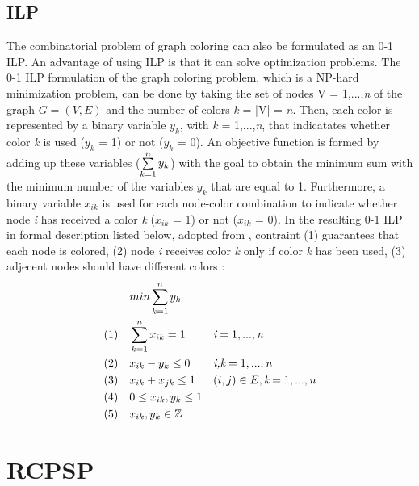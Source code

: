 \documentclass{sig-alternate}
\begin{document}
\subsection{ILP}
The combinatorial problem of graph coloring can also be formulated as an 0-1 ILP. An advantage of using ILP is that it can solve optimization problems. The 0-1 ILP formulation of the graph coloring problem, which is a NP-hard minimization problem, can be done by taking the set of nodes V = {1,...,\emph{n}} of the graph $G = (V,E)$ and the number of colors \emph{k} = |V| = \emph{n}. Then, each color is represented by a binary variable \emph{$y_k$}, with \emph{k} = 1,...,\emph{n}, that indicatates whether color \emph{k} is used (\emph{$y_k$} = 1) or not (\emph{$y_k$} = 0). An objective function is formed by adding up these variables ($\sum\limits_{k=1}^n \emph{$y_k$}$) with the goal to obtain the minimum sum with the minimum number of the variables \emph{$y_k$} that are equal to 1. Furthermore, a binary variable \emph{$x_{ik}$} is used for each node-color combination to indicate whether node \emph{i} has received a color \emph{k} (\emph{$x_{ik}$} = 1) or not (\emph{$x_{ik}$} = 0). In the resulting 0-1 ILP in formal description listed below, adopted from \cite{faigle2002mathprogramming}, contraint (1) guarantees that each node is colored, (2) node \emph{i} receives color \emph{k} only if color \emph{k} has been used, (3) adjecent nodes should have different colors :
\begin{subequations}
\begin{align*}
        & & & min \sum\limits_{k=1}^n \emph{$y_k$} & & \\
        &  (1) & & \sum\limits_{k=1}^n \emph{$x_{ik}$} = 1 & & \emph{i} = 1,...,\emph{n} \\
        &  (2) & & \emph{$x_{ik}$} - \emph{$y_k$} \leq 0 & & \emph{i,k} = 1,...,\emph{n} \\
        &  (3) & &  \emph{$x_{ik}$} + \emph{$x_{jk}$} \leq 1 & & (i,j) \in E, \emph{k} = 1,...,\emph{n} \\
        &  (4) & & 0 \leq \emph{$x_{ik}$}, \emph{$y_k$} \leq 1 & & \\
        &  (5) & & \emph{$x_{ik}$}, \emph{$y_k$} \in \mathbb{Z} & &
\end{align*}
\end{subequations}

\section{RCPSP}
\end{document}
